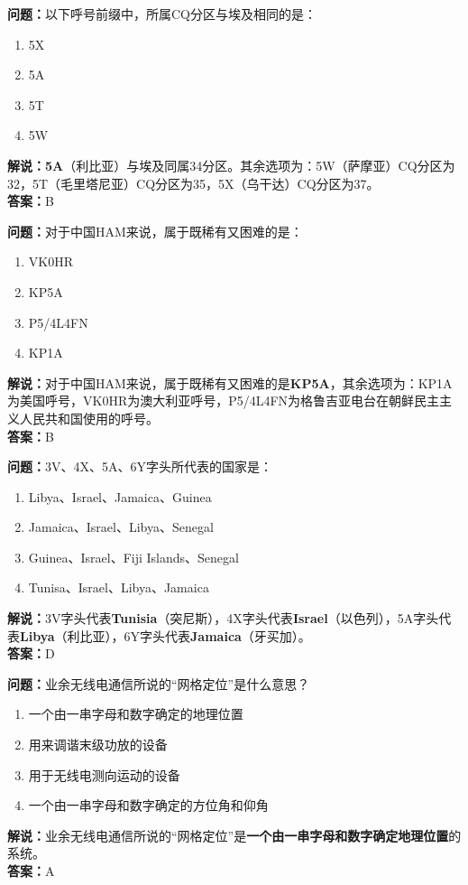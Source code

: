 \bigskip

\noindent\textbf{问题：}以下呼号前缀中，所属CQ分区与埃及相同的是：
\begin{enumerate}[label=\Alph*), leftmargin=3em]
	\item 5X
	\item 5A
	\item 5T
	\item 5W
\end{enumerate}
\noindent\textbf{解说：}\textbf{5A}（利比亚）与埃及同属34分区。其余选项为：5W（萨摩亚）CQ分区为32，5T（毛里塔尼亚）CQ分区为35，5X（乌干达）CQ分区为37。\\\noindent\textbf{答案：}B

\bigskip


\noindent\textbf{问题：}对于中国HAM来说，属于既稀有又困难的是：
\begin{enumerate}[label=\Alph*), leftmargin=3em]
	\item VK0HR
	\item KP5A
	\item P5/4L4FN
	\item KP1A
\end{enumerate}
\noindent\textbf{解说：}对于中国HAM来说，属于既稀有又困难的是\textbf{KP5A}，其余选项为：KP1A为美国呼号，VK0HR为澳大利亚呼号，P5/4L4FN为格鲁吉亚电台在朝鲜民主主义人民共和国使用的呼号。\\\noindent\textbf{答案：}B

\bigskip


\noindent\textbf{问题：}3V、4X、5A、6Y字头所代表的国家是：
\begin{enumerate}[label=\Alph*), leftmargin=3em]
	\item Libya、Israel、Jamaica、Guinea
	\item Jamaica、Israel、Libya、Senegal
	\item Guinea、Israel、Fiji Islands、Senegal
	\item Tunisa、Israel、Libya、Jamaica%
\end{enumerate}
\noindent\textbf{解说：}3V字头代表\textbf{Tunisia}（突尼斯），4X字头代表\textbf{Israel}（以色列），5A字头代表\textbf{Libya}（利比亚），6Y字头代表\textbf{Jamaica}（牙买加）。\\\noindent\textbf{答案：}D


\bigskip


\noindent\textbf{问题：}业余无线电通信所说的“网格定位”是什么意思？
\begin{enumerate}[label=\Alph*), leftmargin=3em]
	\item 一个由一串字母和数字确定的地理位置
	\item 用来调谐末级功放的设备
	\item 用于无线电测向运动的设备
	\item 一个由一串字母和数字确定的方位角和仰角
\end{enumerate}
\noindent\textbf{解说：}业余无线电通信所说的“网格定位”是\textbf{一个由一串字母和数字确定地理位置}的系统。\\\noindent\textbf{答案：}A

\bigskip

